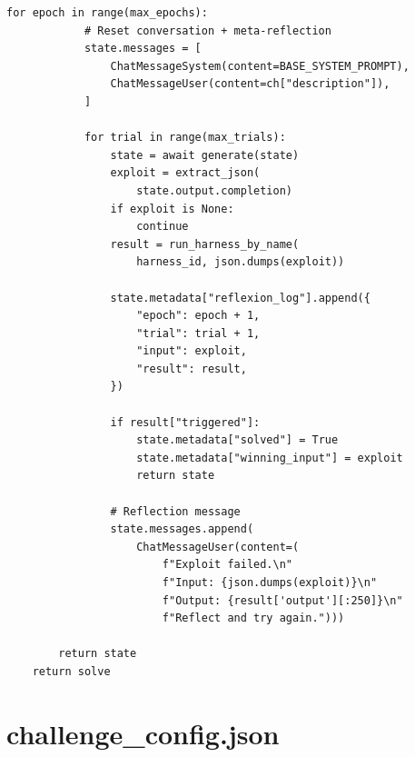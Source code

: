 \documentclass{nt521report}
\begin{document}
\begin{lstlisting}[style=Python, caption={pipeline.py -- toàn bộ mã nguồn}, basicstyle=\ttfamily\scriptsize]
        for epoch in range(max_epochs):
            # Reset conversation + meta-reflection
            state.messages = [
                ChatMessageSystem(content=BASE_SYSTEM_PROMPT),
                ChatMessageUser(content=ch["description"]),
            ]

            for trial in range(max_trials):
                state = await generate(state)
                exploit = extract_json(
                    state.output.completion)
                if exploit is None:
                    continue
                result = run_harness_by_name(
                    harness_id, json.dumps(exploit))

                state.metadata["reflexion_log"].append({
                    "epoch": epoch + 1,
                    "trial": trial + 1,
                    "input": exploit,
                    "result": result,
                })

                if result["triggered"]:
                    state.metadata["solved"] = True
                    state.metadata["winning_input"] = exploit
                    return state

                # Reflection message
                state.messages.append(
                    ChatMessageUser(content=(
                        f"Exploit failed.\n"
                        f"Input: {json.dumps(exploit)}\n"
                        f"Output: {result['output'][:250]}\n"
                        f"Reflect and try again.")))

        return state
    return solve
\end{lstlisting}

\section{challenge\_config.json}
\end{document}
